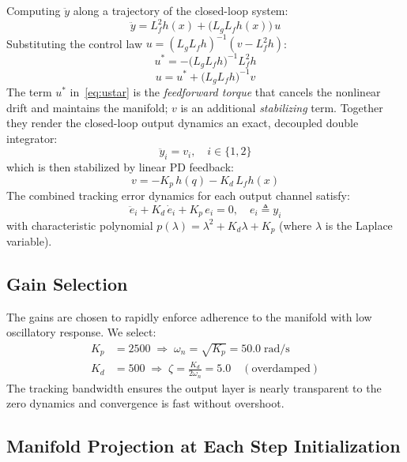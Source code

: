 \documentclass[conference]{IEEEtran}
\begin{document}
Computing $\ddot{y}$ along a trajectory of the closed-loop system:
\begin{equation}
    \ddot{y} = L_f^2 h(x) + \bigl(L_g L_f h(x)\bigr)\, u
\end{equation}
Substituting the control law $u = (L_g L_f h)^{-1}(v - L_f^2 h)$:
\begin{equation}
    u^* = -\bigl(L_g L_f h\bigr)^{-1} L_f^2 h \label{eq:ustar}
\end{equation}
\begin{equation}
    u = u^* + \bigl(L_g L_f h\bigr)^{-1} v \label{eq:fblin}
\end{equation}
The term $u^*$ in~\eqref{eq:ustar} is the \emph{feedforward torque} that cancels the nonlinear drift and maintains the manifold; $v$ is an additional \emph{stabilizing} term. Together they render the closed-loop output dynamics an exact, decoupled double integrator:
\begin{equation}
    \ddot{y}_i = v_i, \quad i \in \{1,2\}
\end{equation}
which is then stabilized by linear PD feedback:
\begin{equation}
    v = -K_p\, h(q) - K_d\, L_f h(x) \label{eq:v}
\end{equation}
The combined tracking error dynamics for each output channel satisfy:
\begin{equation}
    \ddot{e}_i + K_d\, \dot{e}_i + K_p\, e_i = 0, \quad e_i \triangleq y_i \label{eq:errordyn}
\end{equation}
with characteristic polynomial $p(\lambda) = \lambda^2 + K_d\lambda + K_p$ (where $\lambda$ is the Laplace variable).

\subsection{Gain Selection}

The gains are chosen to rapidly enforce adherence to the manifold with low oscillatory response. We select:
\begin{align}
    K_p &= 2500 \;\Rightarrow\; \omega_n = \sqrt{K_p} = 50.0\;\text{rad/s} \\
    K_d &= 500  \;\Rightarrow\; \zeta = \frac{K_d}{2\omega_n} = 5.0 \quad (\text{overdamped})
\end{align}
The tracking bandwidth ensures the output layer is nearly transparent to the zero dynamics and convergence is fast without overshoot.

\subsection{Manifold Projection at Each Step Initialization}
\end{document}
